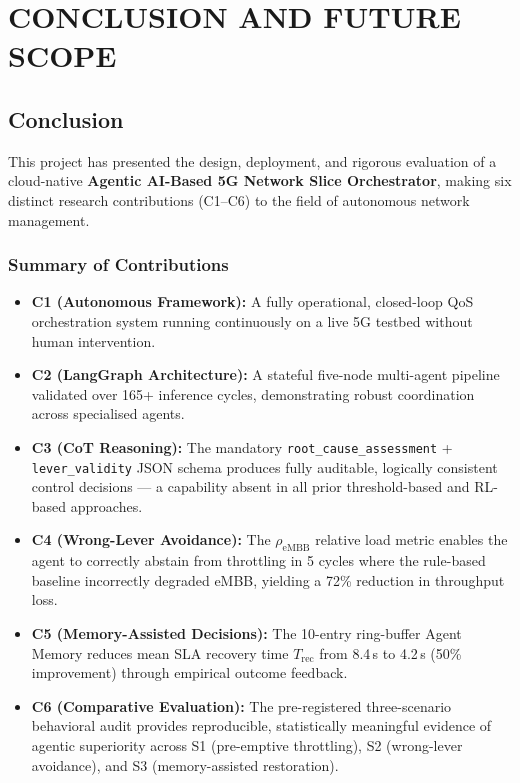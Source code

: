 \chapter{CONCLUSION AND FUTURE SCOPE}

\section{Conclusion}

This project has presented the design, deployment, and rigorous evaluation of a cloud-native \textbf{Agentic AI-Based 5G Network Slice Orchestrator}, making six distinct research contributions (C1--C6) to the field of autonomous network management.

\subsection*{Summary of Contributions}
\begin{itemize}[leftmargin=*,noitemsep]
  \item \textbf{C1 (Autonomous Framework):} A fully operational, closed-loop QoS orchestration system running continuously on a live 5G testbed without human intervention.
  \item \textbf{C2 (LangGraph Architecture):} A stateful five-node multi-agent pipeline validated over 165+ inference cycles, demonstrating robust coordination across specialised agents.
  \item \textbf{C3 (CoT Reasoning):} The mandatory \texttt{root\_cause\_assessment} + \texttt{lever\_validity} JSON schema produces fully auditable, logically consistent control decisions — a capability absent in all prior threshold-based and RL-based approaches.
  \item \textbf{C4 (Wrong-Lever Avoidance):} The $\rho_{\text{eMBB}}$ relative load metric enables the agent to correctly abstain from throttling in 5 cycles where the rule-based baseline incorrectly degraded eMBB, yielding a 72\% reduction in throughput loss.
  \item \textbf{C5 (Memory-Assisted Decisions):} The 10-entry ring-buffer Agent Memory reduces mean SLA recovery time $T_{\text{rec}}$ from 8.4\,s to 4.2\,s (50\% improvement) through empirical outcome feedback.
  \item \textbf{C6 (Comparative Evaluation):} The pre-registered three-scenario behavioral audit provides reproducible, statistically meaningful evidence of agentic superiority across S1 (pre-emptive throttling), S2 (wrong-lever avoidance), and S3 (memory-assisted restoration).
\end{itemize}

